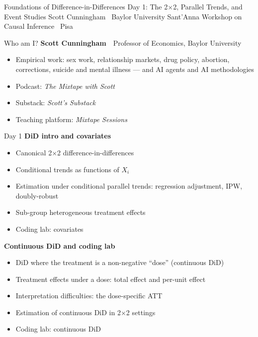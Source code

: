 \documentclass[aspectratio=169,11pt]{beamer}
\begin{document}
\codechellatitle
  {Foundations of Difference-in-Differences}
  {Day 1: The 2$\times$2, Parallel Trends, and Event Studies}
  {Scott Cunningham \textperiodcentered\ Baylor University}
  {Sant'Anna Workshop on Causal Inference \textperiodcentered\ Pisa}




\begin{frame}{Who am I?}
\vspace{0.5em}
\textbf{Scott Cunningham} \,\textperiodcentered\, Professor of Economics, Baylor University
\vspace{0.8em}
\begin{itemize}
  \item Empirical work: sex work, relationship markets, drug policy, abortion, corrections, suicide and mental illness --- and AI agents and AI methodologies
  \item Podcast: \textit{The Mixtape with Scott}
  \item Substack: \textit{Scott's Substack}
  \item Teaching platform: \textit{Mixtape Sessions}
\end{itemize}
\end{frame}

\begin{frame}{Day 1}
\vspace{0.3em}
{\large{} \quad\textbf{DiD intro and covariates}}
\begin{itemize}\setlength{\itemsep}{0.1em}\small
  \item Canonical 2$\times$2 difference-in-differences
  \item Conditional trends as functions of $X_i$
  \item Estimation under conditional parallel trends: regression adjustment, IPW, doubly-robust
  \item Sub-group heterogeneous treatment effects
  \item Coding lab: covariates
\end{itemize}
\vspace{0.4em}
{\large{} \quad\textbf{Continuous DiD and coding lab}}
\begin{itemize}\setlength{\itemsep}{0.15em}\small
  \item DiD where the treatment is a non-negative ``dose'' (continuous DiD)
  \item Treatment effects under a dose: total effect and per-unit effect
  \item Interpretation difficulties: the dose-specific ATT
  \item Estimation of continuous DiD in 2$\times$2 settings
  \item Coding lab: continuous DiD
\end{itemize}
\end{frame}
\end{document}

